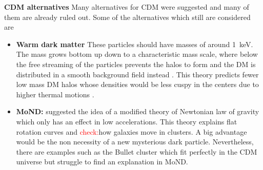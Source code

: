 \textbf{\ac{CDM} alternatives} Many alternatives for \ac{CDM} were suggested and many of them are already ruled out. Some of the alternatives which still are considered are 
\begin{itemize}
    \item \textbf{Warm dark matter} These particles should have masses of around \SI{1}{keV}. The mass grows bottom up down to a characteristic mass scale, where below the free streaming of the particles prevents the halos to form and the \ac{DM} is distributed in a smooth background field instead \citep{Smith...WDM..2011, Schneider...WDM...2013}. This theory predicts fewer low mass \ac{DM} halos whose densities would be less cuspy in the centers due to higher thermal motions \citep{Bode...WDM...2001}.
    \item \textbf{\ac{MoND}:} \cite{Milgrom...MoND...1983} suggested the idea of a modified theory of Newtonian law of gravity which only has an effect in low accelerations. This theory explains flat rotation curves and \textcolor{red}{check:}how galaxies move in clusters. A big advantage would be the non necessity of a new mysterious dark particle. Nevertheless, there are examples such as the Bullet cluster \citep{Clowe...Bullett...2006} which fit perfectly in the \ac{CDM} universe but struggle to find an explanation in \ac{MoND}.
\end{itemize}

